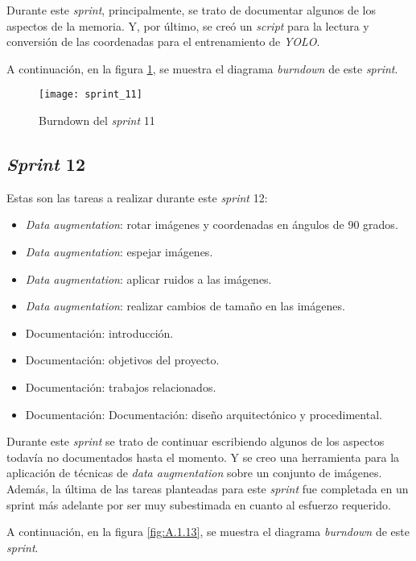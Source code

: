 Durante este \textit{sprint}, principalmente, se trato de documentar algunos de los aspectos de la memoria. Y, por último, se creó un \textit{script} para la lectura y conversión de las coordenadas para el entrenamiento de \textit{YOLO}.

A continuación, en la figura \ref{fig:A.1.12}, se muestra el diagrama \textit{burndown} de este \textit{sprint}.

\begin{figure}
\centering
\texttt{[image: sprint\_11]}
\caption{Burndown del \textit{sprint} 11}
\label{fig:A.1.12}
\end{figure}

\subsection{\textit{Sprint} 12}

Estas son las tareas a realizar durante este \textit{sprint} 12:

\begin{itemize}
	\item \textit{Data augmentation}: rotar imágenes y coordenadas en ángulos de 90 grados.
	\item \textit{Data augmentation}: espejar imágenes.
	\item \textit{Data augmentation}: aplicar ruidos a las imágenes.
	\item \textit{Data augmentation}: realizar cambios de tamaño en las imágenes.
	\item Documentación: introducción.
	\item Documentación: objetivos del proyecto.
	\item Documentación: trabajos relacionados.
	\item Documentación: Documentación: diseño arquitectónico y procedimental.
\end{itemize}

Durante este \textit{sprint} se trato de continuar escribiendo algunos de los aspectos todavía no documentados hasta el momento. Y se creo una herramienta para la aplicación de técnicas de \textit{data augmentation} sobre un conjunto de imágenes. Además, la última de las tareas planteadas para este \textit{sprint} fue completada en un sprint más adelante por ser muy subestimada en cuanto al esfuerzo requerido.

A continuación, en la figura \ref{fig:A.1.13}, se muestra el diagrama \textit{burndown} de este \textit{sprint}.

